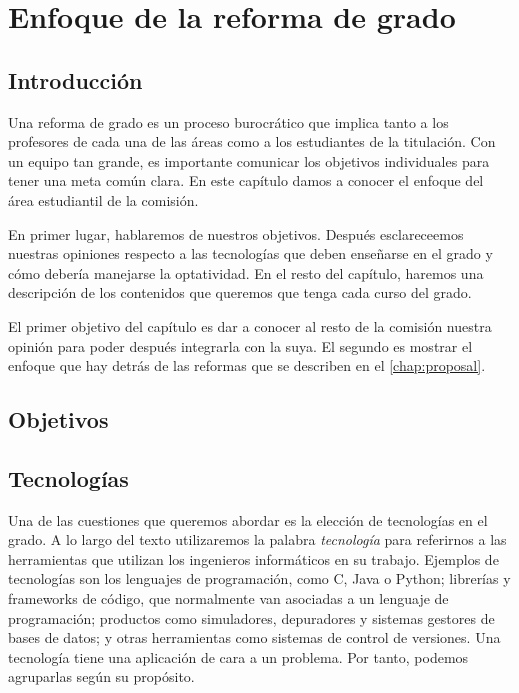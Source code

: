 \chapter{Enfoque de la reforma de grado}\label{chap:approach}

\section{Introducción}


Una reforma de grado es un proceso burocrático que implica tanto a los
profesores de cada una de las áreas como a los estudiantes de la titulación.
Con un equipo tan grande,
es importante comunicar los objetivos individuales para
tener una meta común clara.
En este capítulo damos a conocer el enfoque del área estudiantil de la comisión.


En primer lugar, hablaremos de nuestros objetivos.
Después esclareceemos nuestras opiniones respecto a
las tecnologías que deben enseñarse en el grado y
cómo debería manejarse la optatividad.
En el resto del capítulo,
haremos una descripción de
los contenidos que queremos que tenga cada curso del grado.


El primer objetivo del capítulo es
dar a conocer al resto de la comisión nuestra opinión
para poder después integrarla con la suya.
El segundo es mostrar el enfoque que
hay detrás de las reformas que se describen en el \cref{chap:proposal}.

\section{Objetivos}

\section{Tecnologías}

Una de las cuestiones que queremos abordar es
la elección de tecnologías en el grado.
A lo largo del texto utilizaremos la palabra \emph{tecnología} para referirnos a
las herramientas que utilizan los ingenieros informáticos en su trabajo.
Ejemplos de tecnologías son
los lenguajes de programación,
como C, Java o Python;
librerías y frameworks de código,
que normalmente van asociadas a un lenguaje de programación;
productos como simuladores, depuradores y sistemas gestores de bases de datos; y
otras herramientas como sistemas de control de versiones.
Una tecnología tiene una aplicación de cara a un problema.
Por tanto, podemos agruparlas según su propósito.

